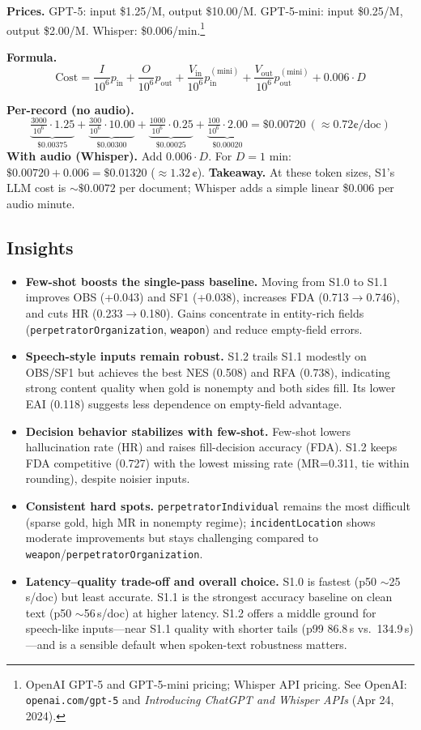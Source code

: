 \textbf{Prices.} GPT-5: input \$1.25/M, output \$10.00/M. GPT-5-mini: input \$0.25/M, output \$2.00/M. Whisper: \$0.006/min.\footnote{OpenAI GPT-5 and GPT-5-mini pricing; Whisper API pricing. See OpenAI: \texttt{openai.com/gpt-5} and \textit{Introducing ChatGPT and Whisper APIs} (Apr 24, 2024).}

\textbf{Formula.}
\[
\text{Cost}=\frac{I}{10^6}p_{\text{in}}+\frac{O}{10^6}p_{\text{out}}
+\frac{V_{\text{in}}}{10^6}p^{(\text{mini})}_{\text{in}}
+\frac{V_{\text{out}}}{10^6}p^{(\text{mini})}_{\text{out}}
+0.006\cdot D
\]

\textbf{Per-record (no audio).}
\[
\underbrace{\tfrac{3000}{10^6}\!\cdot\!1.25}_{\$0.00375}
+\underbrace{\tfrac{300}{10^6}\!\cdot\!10.00}_{\$0.00300}
+\underbrace{\tfrac{1000}{10^6}\!\cdot\!0.25}_{\$0.00025}
+\underbrace{\tfrac{100}{10^6}\!\cdot\!2.00}_{\$0.00020}
=\mathbf{\$0.00720}\ (\approx 0.72\text{¢/doc})
\]
\textbf{With audio (Whisper).} Add $0.006\cdot D$. For $D{=}1$ min: $\$0.00720+0.006=\mathbf{\$0.01320}$ (\(\approx 1.32\,\text{¢}\)).
\textbf{Takeaway.} At these token sizes, S1’s LLM cost is $\sim\$0.0072$ per document; Whisper adds a simple linear \$0.006 per audio minute.


\subsection*{Insights}

\begin{itemize}
    \item \textbf{Few-shot boosts the single-pass baseline.} Moving from S1.0 to S1.1 improves OBS (+0.043) and SF1 (+0.038), increases FDA (0.713$\rightarrow$0.746), and cuts HR (0.233$\rightarrow$0.180). Gains concentrate in entity-rich fields (\texttt{perpetratorOrganization}, \texttt{weapon}) and reduce empty-field errors.
    \item \textbf{Speech-style inputs remain robust.} S1.2 trails S1.1 modestly on OBS/SF1 but achieves the best NES (0.508) and RFA (0.738), indicating strong content quality when gold is nonempty and both sides fill. Its lower EAI (0.118) suggests less dependence on empty-field advantage.
    \item \textbf{Decision behavior stabilizes with few-shot.} Few-shot lowers hallucination rate (HR) and raises fill-decision accuracy (FDA). S1.2 keeps FDA competitive (0.727) with the lowest missing rate (MR{=}0.311, tie within rounding), despite noisier inputs.
    \item \textbf{Consistent hard spots.} \texttt{perpetratorIndividual} remains the most difficult (sparse gold, high MR in nonempty regime); \texttt{incidentLocation} shows moderate improvements but stays challenging compared to \texttt{weapon}/\texttt{perpetratorOrganization}.
    \item \textbf{Latency–quality trade-off and overall choice.} S1.0 is fastest (p50 $\sim$25\,s/doc) but least accurate. S1.1 is the strongest accuracy baseline on clean text (p50 $\sim$56\,s/doc) at higher latency. S1.2 offers a middle ground for speech-like inputs—near S1.1 quality with shorter tails (p99 86.8\,s vs.\ 134.9\,s)—and is a sensible default when spoken-text robustness matters.
\end{itemize}
